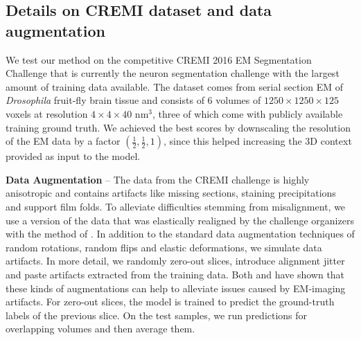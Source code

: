 \subsection{Details on CREMI dataset and data augmentation}\label{sec:cremi_data_augm}
We test our method on the competitive CREMI 2016 EM Segmentation Challenge \cite{cremiChallenge} that is currently the neuron segmentation challenge with the largest amount of training data available. The dataset comes from serial section EM of \emph{Drosophila} fruit-fly brain tissue and consists of 6 volumes of $1250\times 1250\times 125$ voxels at resolution $4\times 4\times 40$ nm$^3$, three of which come with publicly available training ground truth. 
We achieved the best scores by downscaling the resolution of the EM data by a factor $(\frac{1}{2},\frac{1}{2},1)$, since this helped increasing the 3D context provided as input to the model.

\textbf{Data Augmentation} -- The data from the CREMI challenge is highly \linebreak anisotropic and contains artifacts like missing sections, staining precipitations and support film folds. 
To alleviate difficulties stemming from misalignment, we use a version of the data that was elastically realigned by the challenge organizers with the method of \cite{saalfeld2012elastic}.
In addition to the standard data augmentation techniques of random rotations, random flips and  elastic deformations, we simulate data artifacts.
In more detail, we randomly zero-out slices, introduce alignment jitter and paste artifacts extracted from the training data. Both \cite{funke2018large} and \cite{lee2017superhuman} have shown
that these kinds of augmentations can help to alleviate issues caused by EM-imaging artifacts. For zero-out slices, the model is trained to predict the ground-truth labels of the previous slice.
On the test samples, we run predictions for overlapping volumes and then average them.



